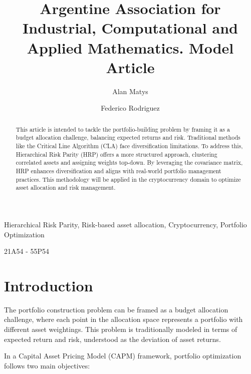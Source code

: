 \documentclass[english]{maciarticle}
\begin{document}
\title{Argentine Association for Industrial, Computational and Applied Mathematics. Model Article}

\author[$\flat$]{Alan Matys}
\author[$\dag$]{Federico Rodriguez}


 \maketitle


\begin{abstract}This article is intended to tackle the portfolio-building problem by framing it as a budget allocation challenge, balancing expected returns and risk. Traditional methods like the Critical Line Algorithm (CLA) face diversification limitations. To address this, Hierarchical Risk Parity (HRP) offers a more structured approach, clustering correlated assets and assigning weights top-down. By leveraging the covariance matrix, HRP enhances diversification and aligns with real-world portfolio management practices. This methodology will be applied in the cryptocurrency domain to optimize asset allocation and risk management.
\end{abstract}
\begin{keywords}
Hierarchical Risk Parity, Risk-based asset allocation, Cryptocurrency, Portfolio Optimization
\end{keywords}
\begin{mathsubclass}
21A54 - 55P54
\end{mathsubclass}


{\thispagestyle{empty}} %



\section{Introduction}


\medskip

The portfolio construction problem can be framed as a budget allocation challenge, where each point in the allocation space represents a portfolio with different asset weightings. This problem is traditionally modeled in terms of expected return and risk, understood as the deviation of asset returns.

In a Capital Asset Pricing Model (CAPM) framework, portfolio optimization follows two main objectives:
\end{document}
